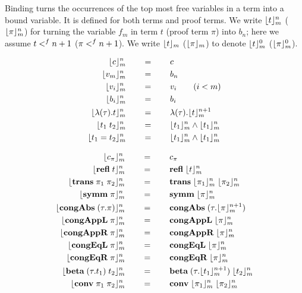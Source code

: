 \documentclass[10pt]{article}
\begin{document}
\begin{mydef}[Binding]\label{def:stlcd-binding}
Binding turns the occurrences of the top most free variables in a term
into a bound variable. It is defined for both terms and proof
terms. We write $\lfloor t\rfloor^{n}_{m}$ ($\lfloor\pi\rfloor^{n}_{m}$) for
turning the variable $f_m$ in term $t$ (proof term $\pi$) into $b_n$;
here we assume $t <^{f} n+1$ ($\pi <^{f} n+1$). We write
$\lfloor t\rfloor_{m}$ ($\lfloor\pi\rfloor_{m}$) to denote $\lfloor t\rfloor^{0}_{m}$
($\lfloor\pi\rfloor^{0}_{m}$).

\begin{align*}
  \lfloor c\rfloor^{n}_{m}   & \qquad = \qquad c\\
  \lfloor v_m\rfloor^{n}_{m} & \qquad = \qquad b_n\\
  \lfloor v_i\rfloor^{n}_{m} & \qquad = \qquad v_i  \qquad (i < m)\\
  \lfloor b_i\rfloor^{n}_{m} & \qquad = \qquad b_i\\
  \lfloor\lambda{(\tau)}.{t}\rfloor^{n}_{m} & \qquad = \qquad 
    \lambda{(\tau)}.{\lfloor t\rfloor^{n+1}_{m}}\\
  \lfloor t_1\; t_2\rfloor^{n}_{m} & \qquad = \qquad
    \lfloor t_1\rfloor^{n}_{m} \land \lfloor t_1\rfloor^{n}_{m}\\
  \lfloor t_1 = t_2\rfloor^{n}_{m} & \qquad = \qquad
    \lfloor t_1\rfloor^{n}_{m} \land \lfloor t_1\rfloor^{n}_{m}
\end{align*}


\begin{align*}
  \lfloor c_\pi\rfloor^{n}_{m}     & \qquad = \qquad c_\pi\\
  \lfloor\mbox{\bf refl}\; t\rfloor^{n}_{m} & \qquad = \qquad \mbox{\bf refl}\;\lfloor t\rfloor^{n}_{m}\\
  \lfloor\mbox{\bf trans}\;\pi_1\; \pi_2\rfloor^{n}_{m} & \qquad = \qquad 
    \mbox{\bf trans}\;\lfloor\pi_1\rfloor^{n}_{m}\; \lfloor\pi_2\rfloor^{n}_{m}\\
  \lfloor\mbox{\bf symm}\; \pi\rfloor^{n}_{m} & \qquad = \qquad 
    \mbox{\bf symm}\; \lfloor\pi\rfloor^{n}_{m}\\
  \lfloor\mbox{\bf congAbs}\;(\tau.\pi)\rfloor^{n}_{m} & \qquad = \qquad 
    \mbox{\bf congAbs}\;(\tau.\lfloor\pi\rfloor^{n+1}_{m})\\
  \lfloor\mbox{\bf congAppL}\;\pi\rfloor^{n}_{m} & \qquad = \qquad 
    \mbox{\bf congAppL}\;\lfloor\pi\rfloor^{n}_{m}\\
  \lfloor\mbox{\bf congAppR}\;\pi\rfloor^{n}_{m} & \qquad = \qquad 
    \mbox{\bf congAppR}\;\lfloor\pi\rfloor^{n}_{m}\\
  \lfloor\mbox{\bf congEqL}\;\pi\rfloor^{n}_{m} & \qquad = \qquad 
    \mbox{\bf congEqL}\;\lfloor\pi\rfloor^{n}_{m}\\
  \lfloor\mbox{\bf congEqR}\;\pi\rfloor^{n}_{m} & \qquad = \qquad 
    \mbox{\bf congEqR}\;\lfloor\pi\rfloor^{n}_{m}\\
  \lfloor\mbox{\bf beta}\;(\tau.t_1)\; t_2\rfloor^{n}_{m} & \qquad = \qquad 
    \mbox{\bf beta}\;(\tau.\lfloor t_1\rfloor^{n+1}_{m})\; \lfloor t_2\rfloor^{n}_{m}\\
  \lfloor\mbox{\bf conv}\; \pi_1\; \pi_2\rfloor^{n}_{m} & \qquad = \qquad
    \mbox{\bf conv}\; \lfloor\pi_1\rfloor^{n}_{m}\; \lfloor\pi_2\rfloor^{n}_{m}
\end{align*}
  
\end{mydef}
\end{document}
